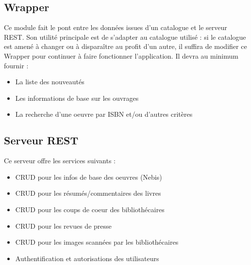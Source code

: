 \documentclass[a4paper, 12pt]{article}
\begin{document}
\subsection{Wrapper}
Ce module fait le pont entre les données issues d'un catalogue et le serveur REST. Son utilité principale est 
de s'adapter au catalogue utilisé : si le catalogue est amené à changer ou à disparaître au profit d'un autre, 
il suffira de modifier ce Wrapper pour continuer à faire fonctionner l'application. Il devra au minimum fournir :
\begin{itemize}
	\item La liste des nouveautés
	\item Les informations de base sur les ouvrages
	\item La recherche d'une oeuvre par ISBN et/ou d'autres critères
\end{itemize}


\subsection{Serveur REST}
Ce serveur offre les services suivants :
\begin{itemize}
	\item CRUD pour les infos de base des oeuvres (Nebis)
	\item CRUD pour les résumés/commentaires des livres
	\item CRUD pour les coups de coeur des bibliothécaires
	\item CRUD pour les revues de presse
	\item CRUD pour les images scannées par les bibliothécaires
	\item Authentification et autorisations des utilisateurs
\end{itemize}
\end{document}
